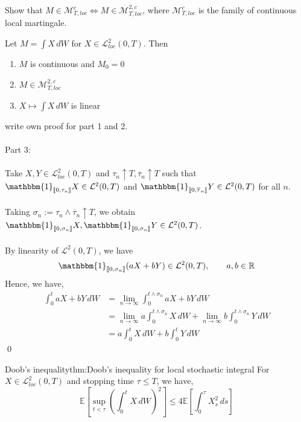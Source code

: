 \documentclass[12pt,a4paper]{article}
\newcommand{\R}{\mathbb{R}}
\newcommand{\E}{\mathbb{E}}
\renewenvironment{proof}
    {\begin{trivlist}\item[\hskip\labelsep\color{blue}\bfseries Proof:]}
    {\qed\end{trivlist}}
\begin{document}
\begin{proposition}{}{}
    Show that $M\in\mathcal{M}_{T,loc}^c\iff M\in\mathcal{M}^{2,c}_{T,loc}$, where $\mathcal{M}^c_{T,loc}$ is the family of continuous local martingale.
\end{proposition}
\begin{proposition}{}{}
    Let $M = \int X\, dW$ for $X\in\mathcal{L}_{loc}^2(0,T)$. Then
    \begin{enumerate}
        \item[1)] $M$ is continuous and $M_0=0$
        \item[2)] $M\in \mathcal{M}^{2,c}_{T,loc}$
        \item[3)] $X\mapsto \int X\, dW$ is linear
    \end{enumerate}
\end{proposition}
\begin{proof}
    write own proof for part 1 and 2.\\
    \\
    Part 3:\\
    \\
    Take $X,Y\in\mathcal{L}^2_{loc}(0,T)$ and $\tau_n \uparrow T,\overline \tau_n\uparrow T$ such that $\mathbbm{1}_{\llbracket 0,\tau_n\rrbracket}X\in\mathcal{L}^2(0,T)$ and $\mathbbm{1}_{\llbracket 0,\overline\tau_n\rrbracket} Y\in\mathcal{L}^2(0,T)$ for all $n$.\\
    \\
    Taking $\sigma_n:= \tau_n\wedge \overline\tau_n\uparrow T$, we obtain $\mathbbm{1}_{\llbracket 0,\sigma_n \rrbracket}X, \mathbbm{1}_{\llbracket 0,\sigma_n\rrbracket} Y\in\mathcal{L}^2(0,T)$.\\
    \\
    By linearity of $\mathcal{L}^2(0,T)$, we have
    $$
    \mathbbm{1}_{\llbracket 0,\sigma_n \rrbracket} (aX+bY) \in\mathcal{L}^2(0,T),\qquad a,b\in \R
    $$
    Hence, we have,
    \begin{align*}
    \int_0^t aX+bY \, dW &= \lim_{n\to\infty}\int_0^{t\wedge \sigma_n} aX+bY\,dW\\
    &= \lim_{n\to\infty} a\int_0^{t\wedge\sigma_n} X\,dW + \lim_{n\to\infty}b\int_0^{t\wedge \sigma_n}Y\,dW\\
    &= a\int_0^t X\, dW + b\int_0^t Y\,dW
    \end{align*}
\end{proof}
\pagebreak
\begin{theorem}{Doob's inequality}{thm:Doob's inequality for local stochastic integral}
    For $X\in\mathcal{L}^2_{loc}(0,T)$ and stopping time $\tau\le T$, we have,
    $$
    \E\left[\sup_{t<\tau}\left(\int_0^t X\,dW\right)^2\right]\le 4\E\left[\int_0^\tau X_s^2\,ds\right]
    $$
\end{theorem}
\end{document}
